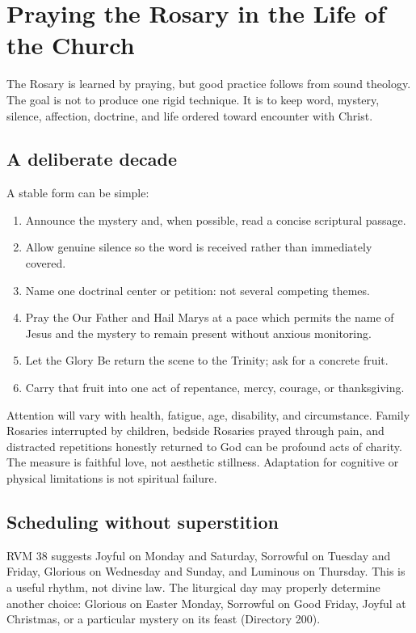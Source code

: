 \section{Praying the Rosary in the Life of the Church}

The Rosary is learned by praying, but good practice follows from sound theology. The goal is not to produce one rigid technique. It is to keep word, mystery, silence, affection, doctrine, and life ordered toward encounter with Christ.

\subsection{A deliberate decade}

A stable form can be simple:

\begin{enumerate}
  \item Announce the mystery and, when possible, read a concise scriptural passage.
  \item Allow genuine silence so the word is received rather than immediately covered.
  \item Name one doctrinal center or petition: not several competing themes.
  \item Pray the Our Father and Hail Marys at a pace which permits the name of Jesus and the mystery to remain present without anxious monitoring.
  \item Let the Glory Be return the scene to the Trinity; ask for a concrete fruit.
  \item Carry that fruit into one act of repentance, mercy, courage, or thanksgiving.
\end{enumerate}

Attention will vary with health, fatigue, age, disability, and circumstance. Family Rosaries interrupted by children, bedside Rosaries prayed through pain, and distracted repetitions honestly returned to God can be profound acts of charity. The measure is faithful love, not aesthetic stillness. Adaptation for cognitive or physical limitations is not spiritual failure.

\subsection{Scheduling without superstition}

RVM 38 suggests Joyful on Monday and Saturday, Sorrowful on Tuesday and Friday, Glorious on Wednesday and Sunday, and Luminous on Thursday. This is a useful rhythm, not divine law. The liturgical day may properly determine another choice: Glorious on Easter Monday, Sorrowful on Good Friday, Joyful at Christmas, or a particular mystery on its feast (Directory 200).

